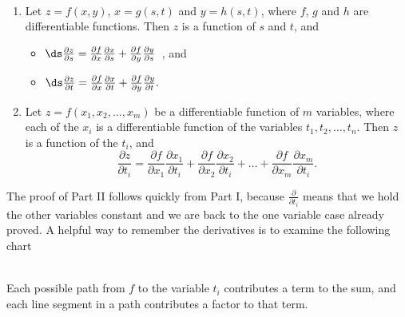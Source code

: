 \begin{theorem}\label{thm:multi_chain2}
%
\mbox{}\\[-2\baselineskip]\parbox[t]{\linewidth}{%
\begin{enumerate}
	\item Let $z=f(x,y)$, $x=g(s,t)$ and $y=h(s,t)$, where $f$, $g$ and $h$ are differentiable functions. Then $z$ is a function of $s$ and $t$, and
	\begin{itemize}
		\item $\ds \frac{\partial z}{\partial s} = \frac{\partial f}{\partial x}\frac{\partial x}{\partial s} + \frac{\partial f}{\partial y}\frac{\partial y}{\partial s}$\ , \quad and 
		\item $\ds \frac{\partial z}{\partial t} = \frac{\partial f}{\partial x}\frac{\partial x}{\partial t} + \frac{\partial f}{\partial y}\frac{\partial y}{\partial t}.$
	\end{itemize}
		
	\item Let $z = f(x_1,x_2,\dots,x_m)$ be a differentiable function of $m$ variables, where each of the $x_i$ is a differentiable function of the variables $t_1,t_2,\dots,t_n$. Then $z$ is a function of the $t_i$, and 
	\[\frac{\partial z}{\partial t_i} = \frac{\partial f}{\partial x_1}\frac{\partial x_1}{\partial t_i} + \frac{\partial f}{\partial x_2}\frac{\partial x_2}{\partial t_i} + \dots +  \frac{\partial f}{\partial x_m}\frac{\partial x_m}{\partial t_i}.\]
\end{enumerate}}
\end{theorem}

The proof of Part II follows quickly from Part I, because $\frac\partial{\partial t_i}$ means that we hold the other variables constant and we are back to the one variable case already proved.  A helpful way to remember the derivatives is to examine the following chart\\
\noindent\begin{minipage}[t]{\linewidth}\noindent%
\captionsetup{type=figure}%
\centering
{}
\end{minipage}\\
Each possible path from $f$ to the variable $t_i$ contributes a term to the sum, and each line segment in a path contributes a factor to that term.

